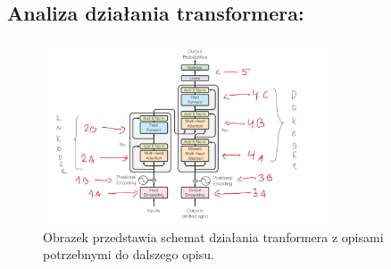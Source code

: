 \documentclass{article}
\begin{document}
\subsection{Analiza działania transformera:}
    \begin{figure}[h]
        \centering
        \includegraphics[width=0.75\textwidth]{images/Schemat-dzialania.png}
        \caption{Obrazek przedstawia schemat działania tranformera z opisami potrzebnymi do dalszego opisu.}
        \label{fig:mesh1}
    \end{figure}
\end{document}

